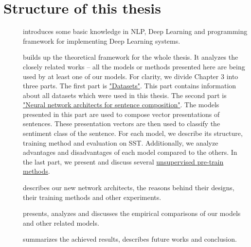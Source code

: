 \section{Structure of this thesis}
\begin{description}
\item [] introduces some basic knowledge in NLP, Deep Learning and programming framework for implementing Deep Learning systems.
\item [] builds up the theoretical framework for the whole thesis.
It analyzes the closely related works -- all the models or methods presented here are being used by at least one of our models.
For clarity, we divide Chapter 3 into three parts.
The first part is \hyperref[sec:dataset]{"Datasets"}.
This part contains information about all datasets which were used in this thesis.
The second part is \hyperref[sec:composer]{"Neural network architects for sentence composition"}.
The models presented in this part are used to compose vector presentations of sentences.
These presentation vectors are then used to classify the sentiment class of the sentence.
For each model, we describe its structure, training method and evaluation on SST.
Additionally, we analyze advantages and disadvantages of each model compared to the others.
In the last part, we present and discuss several \hyperref[sec:unsupervised-pretrain]{unsupervised pre-train methods}.
\item [] describes our new network architects, the reasons behind their designs, their training methods and other experiments.
\item [] presents, analyzes and discusses the empirical comparisons of our models and other related models.
\item [] summarizes the achieved results, describes future works and conclusion.
\end{description}
